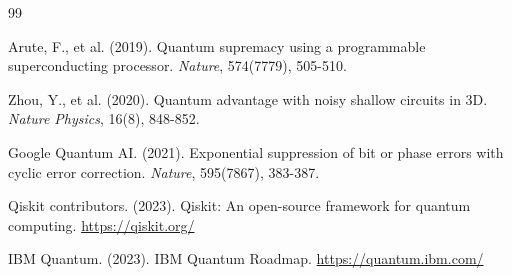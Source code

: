 \documentclass[twocolumn]{article}
\begin{document}
\begin{thebibliography}{99}

 Arute, F., et al. (2019). Quantum supremacy using a programmable superconducting processor. \textit{Nature}, 574(7779), 505-510.

 Zhou, Y., et al. (2020). Quantum advantage with noisy shallow circuits in 3D. \textit{Nature Physics}, 16(8), 848-852.

 Google Quantum AI. (2021). Exponential suppression of bit or phase errors with cyclic error correction. \textit{Nature}, 595(7867), 383-387.

 Qiskit contributors. (2023). Qiskit: An open-source framework for quantum computing. \url{https://qiskit.org/}

 IBM Quantum. (2023). IBM Quantum Roadmap. \url{https://quantum.ibm.com/}

\end{thebibliography}
\end{document}
